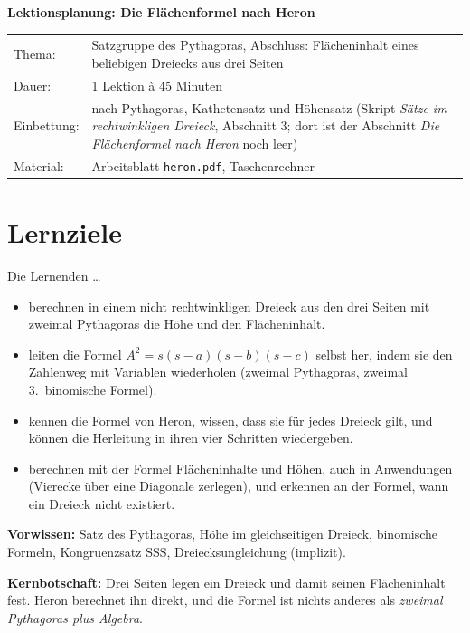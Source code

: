 \documentclass[11pt,oneside]{article}
\begin{document}
{\Large\textbf{Lektionsplanung: Die Flächenformel nach Heron}}\\[2mm]
\begin{tabularx}{\textwidth}{@{}lX}
	Thema: & Satzgruppe des Pythagoras, Abschluss: Flächeninhalt eines beliebigen Dreiecks aus drei Seiten\\
	Dauer: & 1 Lektion à 45 Minuten\\
	Einbettung: & nach Pythagoras, Kathetensatz und Höhensatz (Skript \textit{Sätze im rechtwinkligen Dreieck}, Abschnitt 3; dort ist der Abschnitt \textit{Die Flächenformel nach Heron} noch leer)\\
	Material: & Arbeitsblatt \texttt{heron.pdf}, Taschenrechner\\
\end{tabularx}

\section*{Lernziele}
Die Lernenden \ldots
\begin{itemize}[itemsep=0pt]
	\item berechnen in einem nicht rechtwinkligen Dreieck aus den drei Seiten mit zweimal Pythagoras die Höhe und den Flächeninhalt.
	\item leiten die Formel $A^2=s(s-a)(s-b)(s-c)$ selbst her, indem sie den Zahlenweg mit Variablen wiederholen (zweimal Pythagoras, zweimal 3.\ binomische Formel).
	\item kennen die Formel von Heron, wissen, dass sie für jedes Dreieck gilt, und können die Herleitung in ihren vier Schritten wiedergeben.
	\item berechnen mit der Formel Flächeninhalte und Höhen, auch in Anwendungen (Vierecke über eine Diagonale zerlegen), und erkennen an der Formel, wann ein Dreieck nicht existiert.
\end{itemize}

\textbf{Vorwissen:} Satz des Pythagoras, Höhe im gleichseitigen Dreieck, binomische Formeln, Kongruenzsatz SSS, Dreiecksungleichung (implizit).

\textbf{Kernbotschaft:} Drei Seiten legen ein Dreieck und damit seinen Flächeninhalt fest. Heron berechnet ihn direkt, und die Formel ist nichts anderes als \textit{zweimal Pythagoras plus Algebra}.
\end{document}
